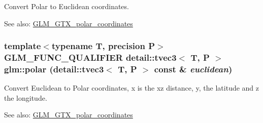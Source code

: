 Convert Polar to Euclidean coordinates.

\begin{Desc}
\item[See also:]\hyperlink{group__gtx__polar__coordinates}{GLM\_\-GTX\_\-polar\_\-coordinates} \end{Desc}
\hypertarget{group__gtx__polar__coordinates_g65a075c52ee1c699d77c4a98dd266006}{
\subsubsection[polar]{\setlength{\rightskip}{0pt plus 5cm}template$<$typename T, precision P$>$ GLM\_\-FUNC\_\-QUALIFIER detail::tvec3$<$ T, P $>$ glm::polar (detail::tvec3$<$ T, P $>$ const \& {\em euclidean})}}
\label{group__gtx__polar__coordinates_g65a075c52ee1c699d77c4a98dd266006}


Convert Euclidean to Polar coordinates, x is the xz distance, y, the latitude and z the longitude.

\begin{Desc}
\item[See also:]\hyperlink{group__gtx__polar__coordinates}{GLM\_\-GTX\_\-polar\_\-coordinates} \end{Desc}
